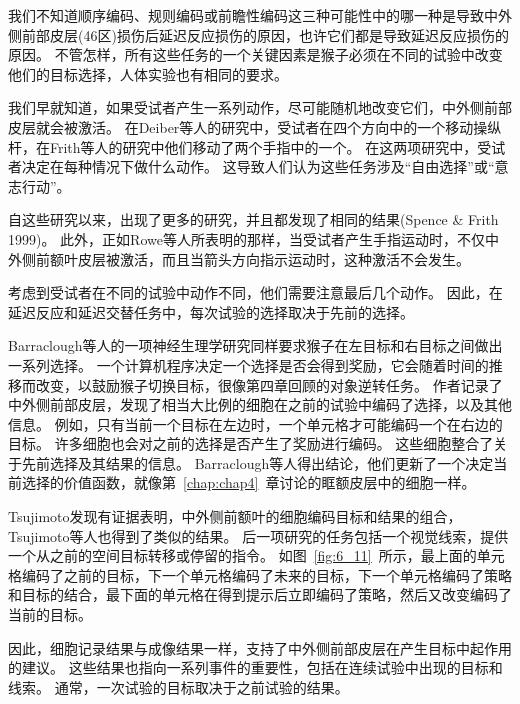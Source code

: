 我们不知道顺序编码、规则编码或前瞻性编码这三种可能性中的哪一种是导致中外侧前部皮层(46区)损伤后延迟反应损伤的原因，也许它们都是导致延迟反应损伤的原因。
不管怎样，所有这些任务的一个关键因素是猴子必须在不同的试验中改变他们的目标选择，人体实验也有相同的要求。


我们早就知道，如果受试者产生一系列动作，尽可能随机地改变它们，中外侧前部皮层就会被激活。
在Deiber等人的研究中\cite{deiber1991cortical}，受试者在四个方向中的一个移动操纵杆，在Frith等人的研究中\cite{frith1991willed}他们移动了两个手指中的一个。
在这两项研究中，受试者决定在每种情况下做什么动作。
这导致人们认为这些任务涉及“自由选择”\cite{playford1992impaired}或“意志行动”\cite{frith1991willed}。


自这些研究以来，出现了更多的研究，并且都发现了相同的结果\cite{frith2000role}(Spence \& Frith 1999)。
此外，正如Rowe等人\cite{rowe2005prefrontal}所表明的那样，当受试者产生手指运动时，不仅中外侧前额叶皮层被激活，而且当箭头方向指示运动时，这种激活不会发生。


考虑到受试者在不同的试验中动作不同，他们需要注意最后几个动作。
因此，在延迟反应和延迟交替任务中，每次试验的选择取决于先前的选择。


Barraclough等人\cite{barraclough2004prefrontal}的一项神经生理学研究同样要求猴子在左目标和右目标之间做出一系列选择。
一个计算机程序决定一个选择是否会得到奖励，它会随着时间的推移而改变，以鼓励猴子切换目标，很像第四章回顾的对象逆转任务。
作者记录了中外侧前部皮层，发现了相当大比例的细胞在之前的试验中编码了选择，以及其他信息。
例如，只有当前一个目标在左边时，一个单元格才可能编码一个在右边的目标。
许多细胞也会对之前的选择是否产生了奖励进行编码。
这些细胞整合了关于先前选择及其结果的信息。
Barraclough等人得出结论，他们更新了一个决定当前选择的价值函数，就像第~\ref{chap:chap4}~章讨论的眶额皮层中的细胞一样。


Tsujimoto\cite{tsujimoto2004neuronal,tsujimoto2005neuronal}发现有证据表明，中外侧前额叶的细胞编码目标和结果的组合，Tsujimoto等人\cite{tsujimoto2011comparison}也得到了类似的结果。
后一项研究的任务包括一个视觉线索，提供一个从之前的空间目标转移或停留的指令。
如图~\ref{fig:6_11}~所示，最上面的单元格编码了之前的目标，下一个单元格编码了未来的目标，下一个单元格编码了策略和目标的结合，最下面的单元格在得到提示后立即编码了策略，然后又改变编码了当前的目标。


因此，细胞记录结果与成像结果一样，支持了中外侧前部皮层在产生目标中起作用的建议。
这些结果也指向一系列事件的重要性，包括在连续试验中出现的目标和线索。
通常，一次试验的目标取决于之前试验的结果。


